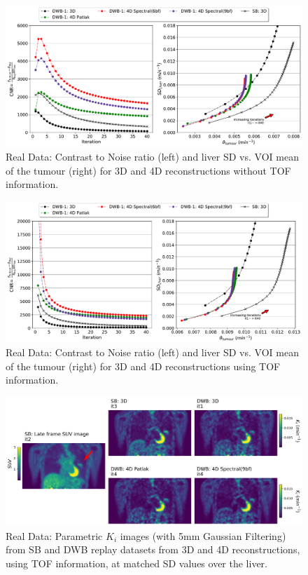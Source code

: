 \begin{figure} [ht!]
\centering
\includegraphics[scale=0.45,angle=0]{3_Results/3_2_Dynamic_Reconstruction_SimulationStudy/figures/RealData/3_5_tumour_Lung_NoTOF.pdf}
\caption{Real Data: Contrast to Noise ratio (left) and liver SD vs. VOI mean of the tumour (right) for 3D and 4D reconstructions without TOF information.} 
\label{fig:RealData_CNR_CoVBias_NoTOF}
\end{figure} 

\begin{figure} [ht!]
\centering
\includegraphics[scale=0.45,angle=0]{3_Results/3_2_Dynamic_Reconstruction_SimulationStudy/figures/RealData/3_5_tumour_Lung.pdf}
\caption{Real Data: Contrast to Noise ratio (left) and liver SD vs. VOI mean of the tumour (right) for 3D and 4D reconstructions using TOF information.} 
\label{fig:RealData_CNR_CoVBias}
\end{figure} 

\begin{figure} [h!]
\centering
\includegraphics[scale=0.28,angle=0]{3_Results/3_2_Dynamic_Reconstruction_SimulationStudy/figures/RealData/3_5_RealDataExample.png}
\caption{Real Data: Parametric $K_i$ images (with 5mm Gaussian Filtering) from SB and DWB replay datasets from 3D and 4D reconstructions, using TOF information, at matched SD values over the liver.} 
\label{fig:RealKiMontage}
\end{figure} 

